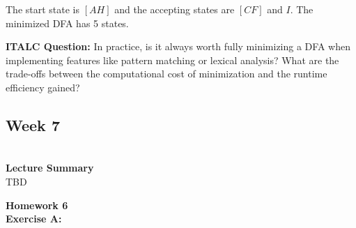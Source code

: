\documentclass{article}
\theoremstyle{theorem}
\theoremstyle{definition}
\theoremstyle{remark}
\begin{document}
The start state is $[AH]$ and the accepting states are $[CF]$ and $I$. The minimized DFA has 5 states.

\textbf{ITALC Question:}
In practice, is it always worth fully minimizing a DFA when implementing features like pattern matching or lexical analysis? What are the trade-offs between the computational cost of minimization and the runtime efficiency gained?

\subsection{\textbf{Week 7}}\\
\textbf{Lecture Summary}\\
TBD

\textbf{Homework 6}\\
\textbf{Exercise A:}\\
\end{document}
